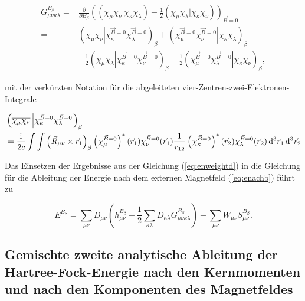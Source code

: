   	 \begin{equation}\label{gmunukaladb}
  	 \begin{aligned}
  	 G_{\mu\nu\kappa\lambda}^{B_\beta}=&\frac{\partial}{\partial B_\beta}\left((\chi_\mu\chi_\nu\vert\chi_\kappa\chi_\lambda)-\frac{1}{2}(\chi_\mu\chi_\lambda\vert\chi_\kappa\chi_\nu)\right)_{\vec{B}=0}\\
  	 =&\left(\overline{\chi_\mu\chi_\nu}\left\vert\chi_\kappa^{\vec{B}=0}\chi_\lambda^{\vec{B}=0}\right.\right)_\beta
  	 +\left(\left.\chi_\mu^{\vec{B}=0}\chi_\nu^{\vec{B}=0}\right\vert\overline{\chi_\kappa\chi_\lambda}\right)_\beta\\
  	 &-\frac{1}{2}\left(\overline{\chi_\mu\chi_\lambda}\left\vert\chi_\kappa^{\vec{B}=0}\chi_\nu^{\vec{B}=0}\right.\right)_\beta
  	 -\frac{1}{2}\left(\left.\chi_\mu^{\vec{B}=0}\chi_\lambda^{\vec{B}=0}\right\vert\overline{\chi_\kappa\chi_\nu}\right)_\beta,
  	 \end{aligned}
     \end{equation}  	  
	
	mit der verkürzten Notation für die abgeleiteten vier-Zentren-zwei-Elektronen-Integrale
	
	\begin{equation}
	\begin{aligned}
	&\left(\overline{\chi_\mu\chi_\nu}\left\vert\chi_\kappa^{\vec{B}=0}\chi_\lambda^{\vec{B}=0}\right.\right)_\beta\\
	&=\frac{\mathrm{i}\mkern1mu}{2c}\int\int\left(\vec{R}_{\mu\nu}\times\vec{r}_1\right)_\beta\left(\chi_\mu^{\vec{B}=0}\right)^*(\vec{r}_1)\chi_\nu^{\vec{B}=0}(\vec{r}_1)\frac{1}{r_{12}}\left(\chi_\kappa^{\vec{B}=0}\right)^*(\vec{r}_2)\chi_\lambda^{\vec{B}=0}(\vec{r}_2)\mathop{}\!\mathrm{d^3} \vec{r}_1 \mathop{}\!\mathrm{d^3} \vec{r}_2\\
	\end{aligned}
	\end{equation}
     
    Das Einsetzen der Ergebnisse aus der Gleichung (\ref{eq:enweightd}) in die Gleichung für die Ableitung der Energie nach dem externen Magnetfeld (\ref{eq:enachb}) führt zu
    
    \begin{equation}
    E^{B_\beta}=\sum_{\mu\nu}D_{\mu\nu}\left(h_{\mu\nu}^{B_\beta}+\frac{1}{2}\sum_{\kappa\lambda}D_{\kappa\lambda}G_{\mu\nu\kappa\lambda}^{B_\beta}\right)-\sum_{\mu\nu}W_{\mu\nu}S_{\mu\nu}^{B_\beta}.
    \end{equation}
    
\subsection{Gemischte zweite analytische Ableitung der Hartree-Fock-Energie nach den Kernmomenten und nach den Komponenten des Magnetfeldes}    

